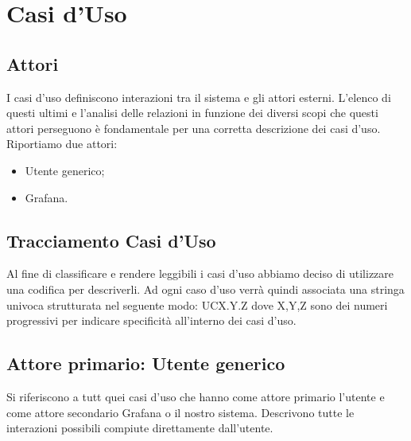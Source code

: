 \section{Casi d'Uso}
		\subsection{Attori}
			I casi d'uso definiscono interazioni tra il sistema e gli attori esterni. L'elenco di questi ultimi e l'analisi delle relazioni in funzione dei diversi scopi che questi attori perseguono è fondamentale per una corretta descrizione dei casi d'uso.
        Riportiamo due attori:
        \begin{itemize}
            \item Utente generico;
            \item Grafana.
        \end{itemize}


		\subsection{Tracciamento Casi d'Uso}
        Al fine di classificare e rendere leggibili i casi d'uso abbiamo deciso di utilizzare una codifica per descriverli. Ad ogni caso d'uso verrà quindi associata una stringa univoca strutturata nel seguente modo: UCX.Y.Z  dove X,Y,Z sono dei numeri progressivi per indicare specificità all'interno dei casi d'uso.

		\subsection{Attore primario: Utente generico}
		Si riferiscono a tutt quei casi d'uso che hanno come attore primario l'utente e come attore secondario Grafana o il nostro sistema. Descrivono tutte le interazioni possibili compiute direttamente dall'utente.
		
